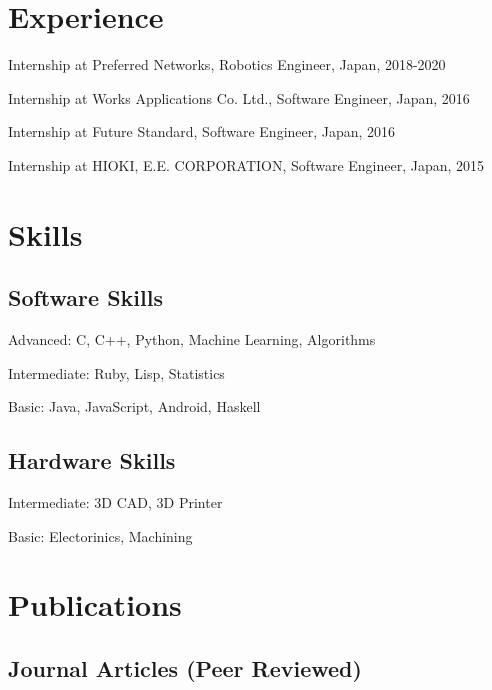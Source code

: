 \documentclass[letterpaper]{article}
\renewenvironment{itemize}{
  \begin{list}{}{
    \setlength{\leftmargin}{1.5em}
  }
}{
  \end{list}
}
\begin{document}
\section*{Experience}

\begin{itemize}
  \item Internship at Preferred Networks, Robotics Engineer, Japan, 2018-2020
  \item Internship at Works Applications Co. Ltd., Software Engineer, Japan, 2016
  \item Internship at Future Standard, Software Engineer, Japan, 2016
  \item Internship at HIOKI, E.E. CORPORATION, Software Engineer, Japan, 2015
\end{itemize}

\section*{Skills}

\subsection*{Software Skills}
\begin{itemize}
  \item Advanced: C, C++, Python, Machine Learning, Algorithms
  \item Intermediate: Ruby, Lisp, Statistics
  \item Basic: Java, JavaScript, Android, Haskell
\end{itemize}

\subsection*{Hardware Skills}
\begin{itemize}
  \item Intermediate: 3D CAD, 3D Printer
  \item Basic: Electorinics, Machining
\end{itemize}

\section*{Publications}

\subsection*{Journal Articles (Peer Reviewed)}
\end{document}
